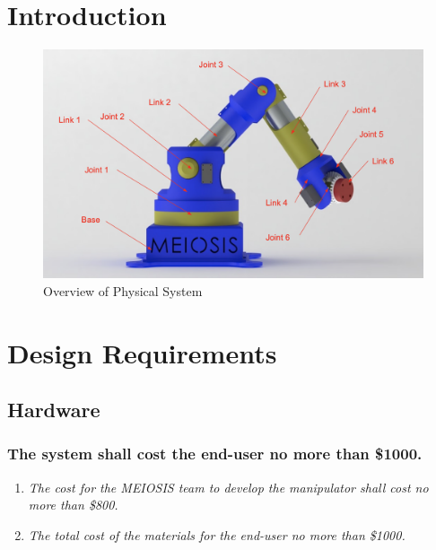 \documentclass[12pt]{report}
\begin{document}
\normalem

{\tableofcontents\let\clearpage\relax\listoffigures}
\clearpage
\newpage


{}

\section{Introduction}
\raggedright
\begin{figure}[htp]
  \centering
  \includegraphics[frame,width=.75\textwidth]{model}
  \caption{Overview of Physical System}
  \label{fig:model}
\end{figure}
\section{Design Requirements}
\subsection{Hardware}

\subsubsection{The system shall cost the end-user no more than \$1000.}
\begin{enumerate}[label=\thesubsubsection.\alph*,leftmargin=3cm,font=\itshape]
  \item \textit{The cost for the MEIOSIS team to develop the manipulator shall cost no more than \$800.}
  \item \textit{The total cost of the materials for the end-user no more than \$1000.}
\end{enumerate}
\end{document}
